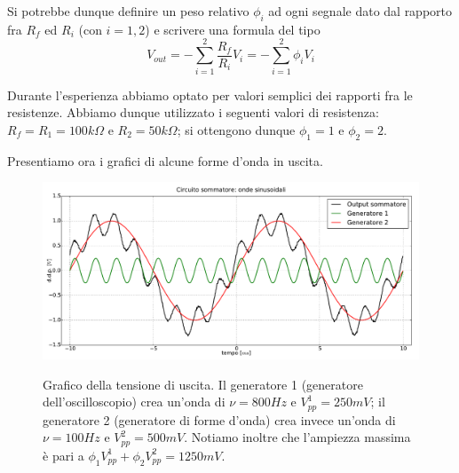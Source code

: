 \documentclass {article}
\begin{document}
Si potrebbe dunque definire un peso relativo $\phi_i$ ad ogni segnale dato dal rapporto fra $R_f$ ed $R_{i}$ (con $i=1,2$) e scrivere una formula del tipo
$$V_{out}=-\sum^{2}_{i=1} \frac{R_f}{R_{i}}V_{i}=-\sum^{2}_{i=1} \phi_i V_{i}$$

Durante l'esperienza abbiamo optato per valori semplici dei rapporti fra le resistenze. Abbiamo dunque utilizzato i seguenti valori di resistenza: $R_f=R_1=100 k\Omega$ e $R_2=50 k\Omega$; si ottengono dunque $\phi_1=1$ e $\phi_2=2$.

Presentiamo ora i grafici di alcune forme d'onda in uscita.

\begin{figure}[ht]
 \centering
   {\includegraphics[width=20cm]{sinsin.pdf}}
 \caption{Grafico della tensione di uscita. Il generatore 1 (generatore dell'oscilloscopio) crea un'onda di $\nu=800 Hz$ e $V^1_{pp}=250 mV$; il generatore 2 (generatore di forme d'onda) crea invece un'onda di $\nu=100 Hz$ e $V^2_{pp}=500 mV$. Notiamo inoltre che l'ampiezza massima è pari a $\phi_1 V^1_{pp}+\phi_2 V^2_{pp}=1250 mV$.}
 \label{gr:costante}
\end{figure}
\end{document}
